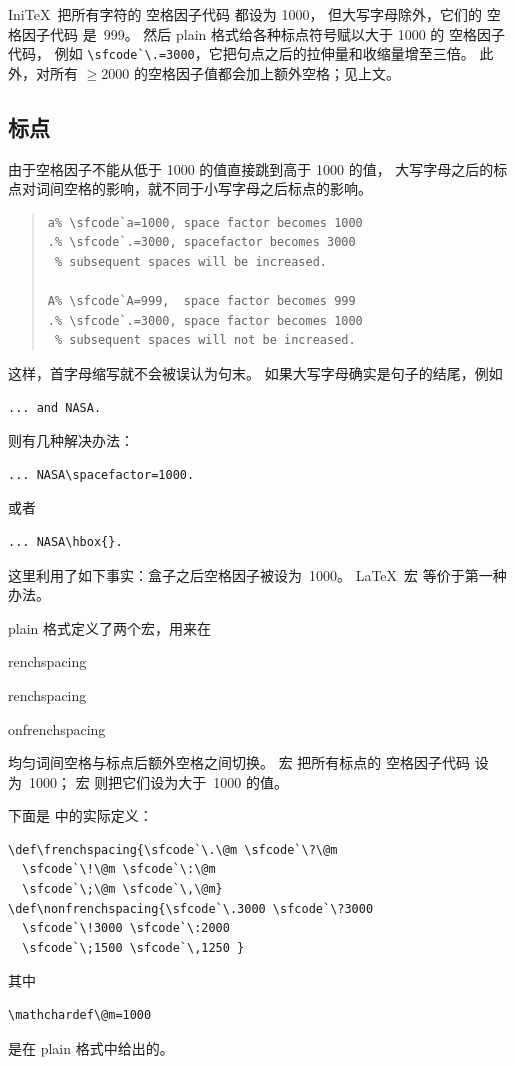 \documentclass[a4paper]{rapport3}
\makeatletter
\def\IniTeX{Ini\TeX}\def\LamsTeX{LAMS\TeX}\def\VirTeX{Vir\TeX}
\newenvironment{example}{\begin{quotation}}{\end{quotation}}
\def\term#1\par{\index{#1}}
\def\cstoidx#1\par{\index{#1@\cs{#1}}}
\makeatother
\begin{document}
\IniTeX\ 把所有字符的 空格因子代码 都设为 1000，
\label{ini:sf}%
但大写字母除外，它们的 空格因子代码 是~999。
然后 plain 格式给各种标点符号赋以大于 1000 的 空格因子代码，
例如 \verb-\sfcode`\.=3000-，它把句点之后的拉伸量和收缩量增至三倍。
此外，对所有 $\geq2000$ 的空格因子值都会加上额外空格；见上文。

\subsection{标点}
\label{sec:sf-punct}

由于空格因子不能从低于 1000 的值直接跳到高于 1000 的值，
大写字母之后的标点对词间空格的影响，就不同于小写字母之后标点的影响。

\begin{example}\begin{verbatim}
a% \sfcode`a=1000, space factor becomes 1000
.% \sfcode`.=3000, spacefactor becomes 3000
 % subsequent spaces will be increased.

A% \sfcode`A=999,  space factor becomes 999
.% \sfcode`.=3000, space factor becomes 1000
 % subsequent spaces will not be increased.
\end{verbatim}
\end{example}

这样，首字母缩写就不会被误认为句末。
如果大写字母确实是句子的结尾，例如
\begin{verbatim}
... and NASA.
\end{verbatim}
则有几种解决办法：
\begin{verbatim}
... NASA\spacefactor=1000.
\end{verbatim}
或者
\begin{verbatim}
... NASA\hbox{}.
\end{verbatim}
这里利用了如下事实：盒子之后空格因子被设为~1000。
\LaTeX\ 宏  等价于第一种办法。

plain 格式定义了两个宏，用来在
\term frenchspacing\par\cstoidx frenchspacing\par
\cstoidx nonfrenchspacing\par
均匀词间空格与标点后额外空格之间切换。
宏  把所有标点的 空格因子代码 设为~1000；
宏  则把它们设为大于~1000 的值。

下面是  中的实际定义：\begin{verbatim}
\def\frenchspacing{\sfcode`\.\@m \sfcode`\?\@m 
  \sfcode`\!\@m \sfcode`\:\@m 
  \sfcode`\;\@m \sfcode`\,\@m}
\def\nonfrenchspacing{\sfcode`\.3000 \sfcode`\?3000
  \sfcode`\!3000 \sfcode`\:2000
  \sfcode`\;1500 \sfcode`\,1250 }
\end{verbatim}
其中 \begin{verbatim}
\mathchardef\@m=1000
\end{verbatim}
是在 plain 格式中给出的。
\end{document}
